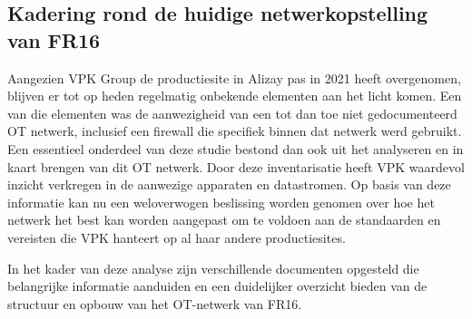 \subsection{Kadering rond de huidige netwerkopstelling van FR16}
Aangezien VPK Group de productiesite in Alizay pas in 2021 heeft overgenomen, blijven er tot op heden regelmatig onbekende elementen aan het licht komen. Een van die elementen was de aanwezigheid van een tot dan toe niet gedocumenteerd OT netwerk, inclusief een firewall die specifiek binnen dat netwerk werd gebruikt. Een essentieel onderdeel van deze studie bestond dan ook uit het analyseren en in kaart brengen van dit OT netwerk. Door deze inventarisatie heeft VPK waardevol inzicht verkregen in de aanwezige apparaten en datastromen. Op basis van deze informatie kan nu een weloverwogen beslissing worden genomen over hoe het netwerk het best kan worden aangepast om te voldoen aan de standaarden en vereisten die VPK hanteert op al haar andere productiesites.

In het kader van deze analyse zijn verschillende documenten opgesteld die belangrijke informatie aanduiden en een duidelijker overzicht bieden van de structuur en opbouw van het OT-netwerk van FR16.

\begin{table}[h!]
    \centering
    \caption{Overzicht van het apparaat SW\_MAP\_UC\_MASTER binnen het OT-netwerk.}
\end{table}




